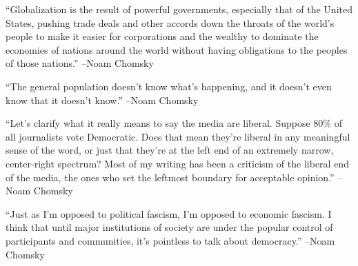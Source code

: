 \documentclass{article}%
\begin{document}
\linebreak%
\vspace{1mm}%
\begin{minipage}{\textwidth}%
\flushleft%
“Globalization is the result of powerful governments, especially that of the United States, pushing trade deals and other accords down the throats of the world's people to make it easier for corporations and the wealthy to dominate the economies of nations around the world without having obligations to the peoples of those nations.”%
\linebreak%
\vspace{1mm}%
–Noam Chomsky%
\linebreak%
\vspace{1mm}%
\end{minipage}%
\linebreak%
\vspace{1mm}%
\begin{minipage}{\textwidth}%
\flushleft%
“The general population doesn't know what's happening, and it doesn't even know that it doesn't know.”%
\linebreak%
\vspace{1mm}%
–Noam Chomsky%
\linebreak%
\vspace{1mm}%
\end{minipage}%
\linebreak%
\vspace{1mm}%
\begin{minipage}{\textwidth}%
\flushleft%
“Let's clarify what it really means to say the media are liberal. Suppose 80\% of all journalists vote Democratic. Does that mean they're liberal in any meaningful sense of the word, or just that they're at the left end of an extremely narrow, center{-}right spectrum? Most of my writing has been a criticism of the liberal end of the media, the ones who set the leftmost boundary for acceptable opinion.”%
\linebreak%
\vspace{1mm}%
–Noam Chomsky%
\linebreak%
\vspace{1mm}%
\end{minipage}%
\linebreak%
\vspace{1mm}%
\begin{minipage}{\textwidth}%
\flushleft%
“Just as I'm opposed to political fascism, I'm opposed to economic fascism. I think that until major institutions of society are under the popular control of participants and communities, it's pointless to talk about democracy.”%
\linebreak%
\vspace{1mm}%
–Noam Chomsky%
\linebreak%
\vspace{1mm}%
\end{minipage}%
\end{document}
